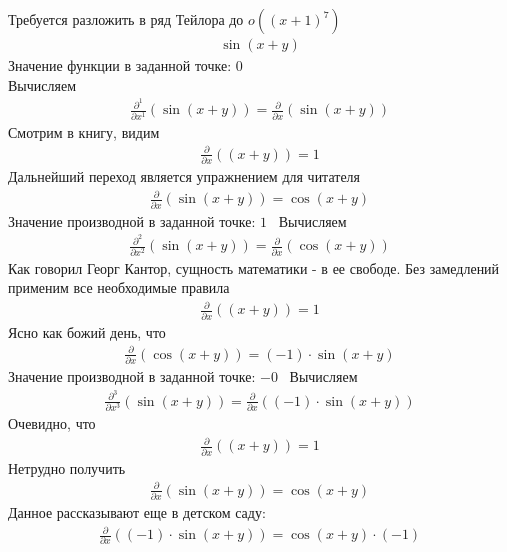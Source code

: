 \documentclass{article}
\begin{document}
Требуется разложить в ряд Тейлора до $o({(x+1)}^{7})$
\begin{gather}\sin{ \left(x + y\right) }
\end{gather}Значение функции в заданной точке: $0$ \\ 
Вычисляем
\begin{gather}
\frac{\partial ^{1}}{\partial {x}^{1}}\left(\sin{ \left(x + y\right) }\right)=\frac{\partial }{\partial x}\left(\sin{ \left(x + y\right) }\right)
\end{gather}
Смотрим в книгу, видим
\begin{gather}
\frac{\partial }{\partial x}\left(\left(x + y\right)\right)=1
\end{gather}
Дальнейший переход является упражнением для читателя
\begin{gather}
\frac{\partial }{\partial x}\left(\sin{ \left(x + y\right) }\right)=\cos{ \left(x + y\right) }
\end{gather}
Значение производной в заданной точке: $1$ \ 
Вычисляем
\begin{gather}
\frac{\partial ^{2}}{\partial {x}^{2}}\left(\sin{ \left(x + y\right) }\right)=\frac{\partial }{\partial x}\left(\cos{ \left(x + y\right) }\right)
\end{gather}
Как говорил Георг Кантор, сущность математики - в ее свободе. Без замедлений применим все необходимые правила
\begin{gather}
\frac{\partial }{\partial x}\left(\left(x + y\right)\right)=1
\end{gather}
Ясно как божий день, что
\begin{gather}
\frac{\partial }{\partial x}\left(\cos{ \left(x + y\right) }\right)=(-1) \cdot \sin{ \left(x + y\right) }
\end{gather}
Значение производной в заданной точке: $-0$ \ 
Вычисляем
\begin{gather}
\frac{\partial ^{3}}{\partial {x}^{3}}\left(\sin{ \left(x + y\right) }\right)=\frac{\partial }{\partial x}\left((-1) \cdot \sin{ \left(x + y\right) }\right)
\end{gather}
Очевидно, что
\begin{gather}
\frac{\partial }{\partial x}\left(\left(x + y\right)\right)=1
\end{gather}
Нетрудно получить
\begin{gather}
\frac{\partial }{\partial x}\left(\sin{ \left(x + y\right) }\right)=\cos{ \left(x + y\right) }
\end{gather}
Данное рассказывают еще в детском саду:
\begin{gather}
\frac{\partial }{\partial x}\left((-1) \cdot \sin{ \left(x + y\right) }\right)=\cos{ \left(x + y\right) } \cdot (-1)
\end{gather}
\end{document}
